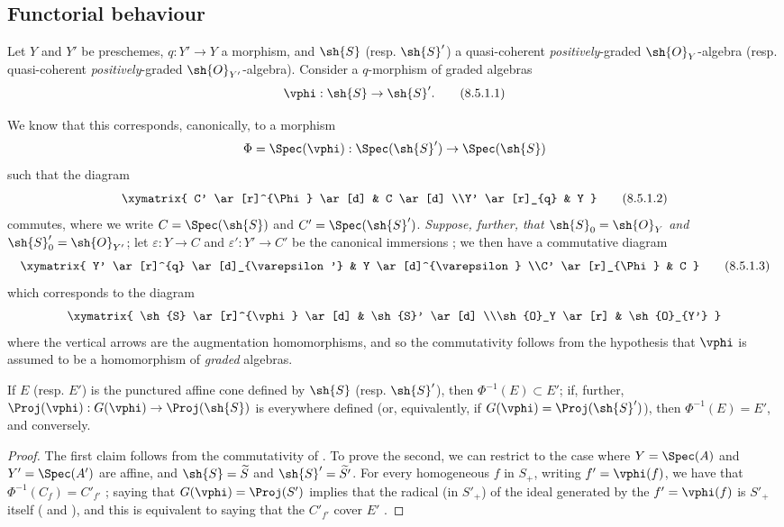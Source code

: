 \subsection{Functorial behaviour}
\label{subsection:II.8.5}

\begin{env}[8.5.1]
\label{II.8.5.1}
Let $Y$ and $Y'$ be preschemes, $q:Y'\to Y$ a morphism, and $\sh{S}$ (resp. $\sh{S}'$) a quasi-coherent \emph{positively}-graded $\sh{O}_Y$-algebra (resp. quasi-coherent \emph{positively}-graded $\sh{O}_{Y'}$-algebra).
Consider a $q$-morphism of graded algebras
\[
\label{eq:2.8.5.1.1}
  \vphi: \sh{S} \to \sh{S}'.
\tag{8.5.1.1}
\]

We know  that this corresponds, canonically, to a morphism
\[
  \Phi = \Spec(\vphi): \Spec(\sh{S}') \to \Spec(\sh{S})
\]
such that the diagram
\[
\label{eq:2.8.5.1.2}
  \xymatrix{
    C'
      \ar[r]^{\Phi}
      \ar[d]
  & C
      \ar[d]
  \\Y'
      \ar[r]_{q}
  & Y
  }
\tag{8.5.1.2}
\]
commutes, where we write $C=\Spec(\sh{S})$ and $C'=\Spec(\sh{S}')$.
\emph{Suppose, further, that $\sh{S}_0=\sh{O}_Y$ and $\sh{S}'_0=\sh{O}_{Y'}$};
let $\varepsilon:Y\to C$ and $\varepsilon':Y'\to C'$ be the canonical immersions ;
we then have a commutative diagram
\[
\label{eq:2.8.5.1.3}
  \xymatrix{
    Y'
      \ar[r]^{q}
      \ar[d]_{\varepsilon'}
  & Y
      \ar[d]^{\varepsilon}
  \\C'
      \ar[r]_{\Phi}
  & C
  }
\tag{8.5.1.3}
\]
which corresponds to the diagram
\[
  \xymatrix{
    \sh{S}
      \ar[r]^{\vphi}
      \ar[d]
  & \sh{S}'
      \ar[d]
  \\\sh{O}_Y
      \ar[r]
  & \sh{O}_{Y'}
  }
\]
where the vertical arrows are the augmentation homomorphisms, and so the commutativity follows from the hypothesis that $\vphi$ is assumed to be a homomorphism of \emph{graded} algebras.
\end{env}

\begin{proposition}[8.5.2]
\label{II.8.5.2}
If $E$ (resp. $E'$) is the punctured affine cone defined by $\sh{S}$ (resp. $\sh{S}'$), then $\Phi^{-1}(E)\subset E'$;
if, further, $\Proj(\vphi):G(\vphi)\to\Proj(\sh{S})$ is everywhere defined (or, equivalently, if $G(\vphi)=\Proj(\sh{S}')$), then $\Phi^{-1}(E)=E'$, and conversely.
\end{proposition}

\begin{proof}
The first claim follows from the commutativity of .
To prove the second, we can restrict to the case where $Y=\Spec(A)$ and $Y'=\Spec(A')$ are affine, and $\sh{S}=\widetilde{S}$ and $\sh{S}'=\widetilde{S'}$.
For every homogeneous $f$ in $S_+$, writing $f'=\vphi(f)$, we have that $\Phi^{-1}(C_f)=C'_{f'}$ ;
saying that $G(\vphi)=\Proj(S')$ implies that the radical (in $S'_+$) of the ideal generated by the $f'=\vphi(f)$ is $S'_+$ itself ( and ), and this is equivalent to saying that the $C'_{f'}$ cover $E'$ .
\end{proof}


